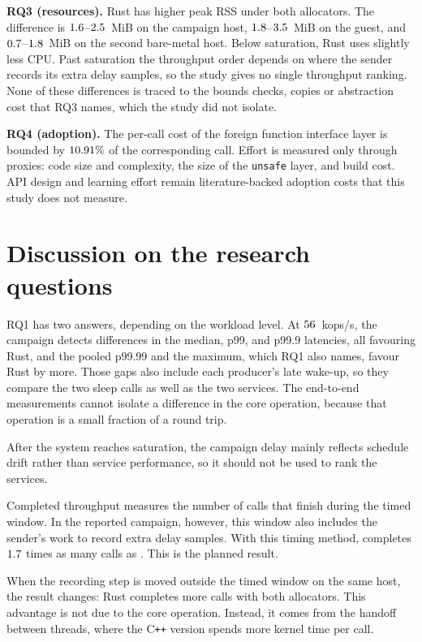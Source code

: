 \documentclass[english,oneside,a4paper,censored,csm,software-track-2020]{HYthesisML}
\begin{document}
\begin{compactitem}
\item \textbf{RQ3 (resources).} Rust has higher peak RSS under both allocators. The difference is
$1.6$--$2.5$~MiB on the campaign host, $1.8$--$3.5$~MiB
on the guest, and $0.7$--$1.8$~MiB on the second bare-metal host. Below
saturation, Rust uses slightly less CPU. Past saturation the throughput order depends on
where the sender records its extra delay samples, so the study gives no single throughput
ranking. None of these differences is traced to the bounds checks, copies or abstraction
cost that RQ3 names, which the study did not isolate.

\item \textbf{RQ4 (adoption).} The per-call cost of the foreign function interface layer is
bounded by $10.91\%$ of the corresponding call. Effort is measured only through
proxies: code size and complexity, the size of the \texttt{unsafe} layer, and build cost. API
design and learning effort remain literature-backed adoption costs that this study does not
measure.
\end{compactitem}

\section{Discussion on the research questions}\label{sec:rqdiscussion}
RQ1 has two answers, depending on the workload level. At $56$~kops/s,
the campaign detects differences in the median, p99, and p99.9 latencies, all
favouring Rust, and the pooled p99.99 and the maximum, which RQ1 also names,
favour Rust by more. Those gaps also include each producer's late wake-up, so they
compare the two sleep calls as well as the two services. The end-to-end
measurements cannot isolate a difference in the core operation, because that
operation is a small fraction of a round trip.

After the system reaches saturation, the campaign delay mainly reflects
schedule drift rather than service performance, so it should not be used to
rank the services.

Completed throughput measures the number of calls that finish during the timed
window. In the reported campaign, however, this window also includes the sender's
work to record extra delay samples. With this timing method,
\OverloadSustainedFaster{} completes $1.7$ times as many calls as
\OverloadSustainedSlower{}. This is the planned result.

When the recording step is moved outside the timed window on the same host, the
result changes: Rust completes more calls with both allocators. This advantage is
not due to the core operation. Instead, it comes from the handoff between
threads, where the C\texttt{++} version spends more kernel time per call.
\end{document}
